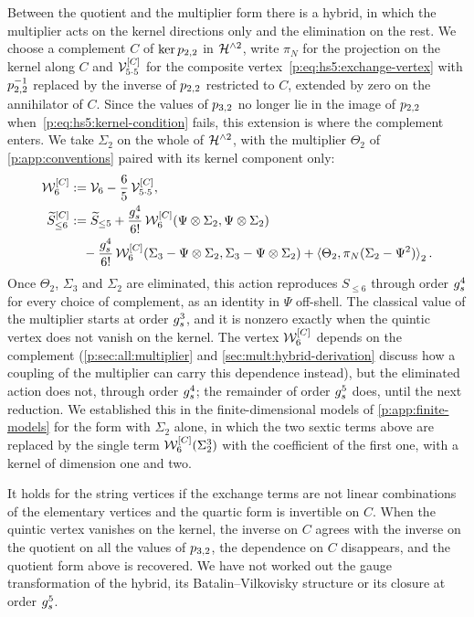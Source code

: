 Between the quotient and the multiplier form there is a hybrid, in which the multiplier acts on the kernel directions only and the elimination on the rest.
  We choose a complement $C$ of $\ker \sprod{2}{2}$ in $\Hn{2}$, write $\pi_N$ for the projection on the kernel along $C$ and $\vertex{5 \cdot 5}^{[C]}$ for the composite vertex~\eqref{p:eq:hs5:exchange-vertex} with $\sprod{2}{2}^{-1}$ replaced by the inverse of $\sprod{2}{2}$ restricted to $C$, extended by zero on the annihilator of $C$.
  Since the values of $\sprod{3}{2}$ no longer lie in the image of $\sprod{2}{2}$ when~\eqref{p:eq:hs5:kernel-condition} fails, this extension is where the complement enters.
  We take $\Sigma_2$ on the whole of $\Hn{2}$, with the multiplier $\Theta_2$ of \cref{p:app:conventions} paired with its kernel component only:
  \begin{equation}
  \label{p:eq:hs6:dressed-vertex-C}
  \begin{aligned}
    \dvertex{6}^{[C]}
      &
      := \vertex{6} - \frac{6}{5} \, \vertex{5 \cdot 5}^{[C]},
    \\
    \caction[\le 6]^{[C]}
      &
      := \caction[\le 5]
        + \frac{\gs^4}{6!} \, \dvertex{6}^{[C]}(\Psi \otimes \Sigma_2, \Psi \otimes \Sigma_2)
    \\ &
    \quad
        - \frac{\gs^4}{6!} \, \dvertex{6}^{[C]}(\Sigma_3 - \Psi \otimes \Sigma_2, \Sigma_3 - \Psi \otimes \Sigma_2)
        + \pair[2]{\Theta_2}{\pi_N(\Sigma_2 - \Psi^2)}.
  \end{aligned}
\end{equation}
  Once $\Theta_2$, $\Sigma_3$ and $\Sigma_2$ are eliminated, this action reproduces $S_{\le 6}$ through order $\gs^4$ for every choice of complement, as an identity in $\Psi$ off-shell.
  The classical value of the multiplier starts at order $\gs^3$, and it is nonzero exactly when the quintic vertex does not vanish on the kernel.
  The vertex $\dvertex{6}^{[C]}$ depends on the complement (\cref{p:sec:all:multiplier} and \cref{sec:mult:hybrid-derivation} discuss how a coupling of the multiplier can carry this dependence instead), but the eliminated action does not, through order $\gs^4$; the remainder of order $\gs^5$ does, until the next reduction.
  We established this in the finite-dimensional models of \cref{p:app:finite-models} for the form with $\Sigma_2$ alone, in which the two sextic terms above are replaced by the single term $\dvertex{6}^{[C]}(\Sigma_2^3)$ with the coefficient of the first one, with a kernel of dimension one and two.

  It holds for the string vertices if the exchange terms are not linear combinations of the elementary vertices and the quartic form is invertible on $C$.
  When the quintic vertex vanishes on the kernel, the inverse on $C$ agrees with the inverse on the quotient on all the values of $\sprod{3}{2}$, the dependence on $C$ disappears, and the quotient form above is recovered.
  We have not worked out the gauge transformation of the hybrid, its Batalin--Vilkovisky structure or its closure at order $\gs^5$.
